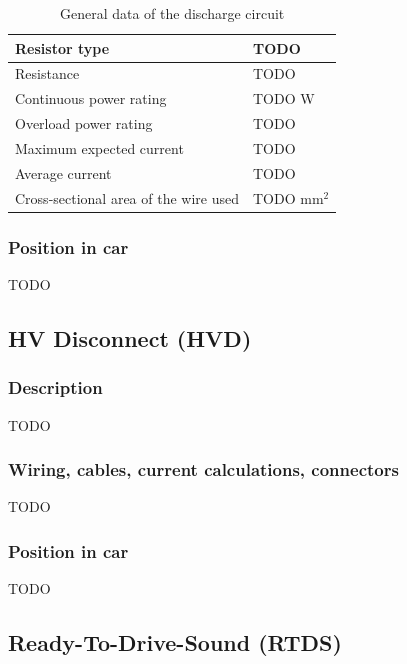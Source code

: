 \documentclass{article}
\begin{document}
	\begin{table}[H]
		\centering
		\begin{tabular}{|l|l|}
		\hline
		Resistor type & TODO \\ \hline
		Resistance & TODO \ohm \\ \hline
		Continuous power rating & TODO W \\ \hline
		Overload power rating & TODO \\ \hline
		Maximum expected current & TODO \\ \hline
		Average current & TODO\\ \hline
		Cross-sectional area of the wire used & TODO mm$^2$ \\ \hline
		\end{tabular}
		\caption{General data of the discharge circuit}
		\label{dctable}
	\end{table}

\subsubsection{Position in car}
TODO

\subsection{HV Disconnect (HVD)}\label{hv_disconnect}
\subsubsection{Description}
TODO

\subsubsection{Wiring, cables, current calculations, connectors}
TODO

\subsubsection{Position in car}
TODO

\subsection{Ready-To-Drive-Sound (RTDS)}\label{ready_to_drive_sound}
\end{document}
